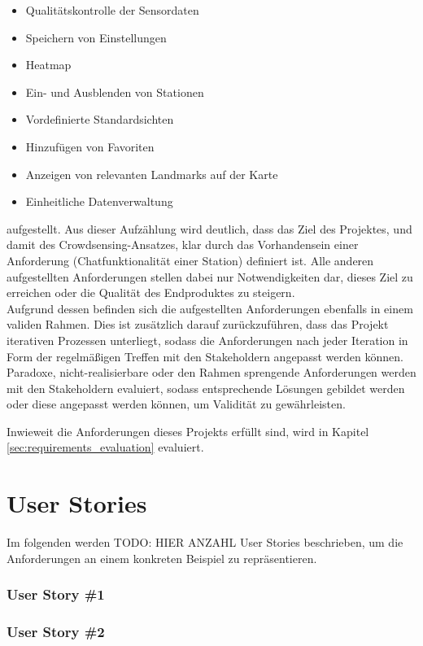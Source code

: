 \begin{itemize}
    \item Qualitätskontrolle der Sensordaten
    \item Speichern von Einstellungen
    \item Heatmap
    \item Ein- und Ausblenden von Stationen
    \item Vordefinierte Standardsichten
    \item Hinzufügen von Favoriten
    \item Anzeigen von relevanten Landmarks auf der Karte
    \item Einheitliche Datenverwaltung
\end{itemize}

aufgestellt. Aus dieser Aufzählung wird deutlich, dass das Ziel des Projektes, und damit des Crowdsensing-Ansatzes, klar durch das Vorhandensein einer Anforderung (Chatfunktionalität einer Station) definiert ist. Alle anderen aufgestellten Anforderungen stellen dabei nur Notwendigkeiten dar, dieses Ziel zu erreichen oder die Qualität des Endproduktes zu steigern. \\ Aufgrund dessen befinden sich die aufgestellten Anforderungen ebenfalls in einem validen Rahmen. Dies ist zusätzlich darauf zurückzuführen, dass das Projekt iterativen Prozessen unterliegt, sodass die Anforderungen nach jeder Iteration in Form der regelmäßigen Treffen mit den Stakeholdern angepasst werden können. Paradoxe, nicht-realisierbare oder den Rahmen sprengende Anforderungen werden mit den Stakeholdern evaluiert, sodass entsprechende Lösungen gebildet werden oder diese angepasst werden können, um Validität zu gewährleisten.

Inwieweit die Anforderungen dieses Projekts erfüllt sind, wird in Kapitel \ref{sec:requirements_evaluation} evaluiert. 

\section{User Stories}
Im folgenden werden TODO: HIER ANZAHL User Stories beschrieben, um die Anforderungen an einem konkreten Beispiel zu repräsentieren. 

\subsubsection{User Story \#1}

\subsubsection{User Story \#2}

